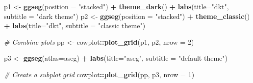 \documentclass[fleqn,10pt]{wlpeerj} %
\newenvironment{Shaded}{\begin{snugshade}}{\end{snugshade}}
\newcommand{\CommentTok}[1]{\textcolor[rgb]{0.56,0.35,0.01}{\textit{#1}}}
\newcommand{\DataTypeTok}[1]{\textcolor[rgb]{0.13,0.29,0.53}{#1}}
\newcommand{\DecValTok}[1]{\textcolor[rgb]{0.00,0.00,0.81}{#1}}
\newcommand{\KeywordTok}[1]{\textcolor[rgb]{0.13,0.29,0.53}{\textbf{#1}}}
\newcommand{\NormalTok}[1]{#1}
\newcommand{\OperatorTok}[1]{\textcolor[rgb]{0.81,0.36,0.00}{\textbf{#1}}}
\newcommand{\StringTok}[1]{\textcolor[rgb]{0.31,0.60,0.02}{#1}}
\begin{document}
\begin{Shaded}
\begin{Highlighting}[]
\NormalTok{p1 <-}\StringTok{ }\KeywordTok{ggseg}\NormalTok{(}\DataTypeTok{position =} \StringTok{"stacked"}\NormalTok{) }\OperatorTok{+}\StringTok{ }
\StringTok{  }\KeywordTok{theme_dark}\NormalTok{() }\OperatorTok{+}\StringTok{ }
\StringTok{  }\KeywordTok{labs}\NormalTok{(}\DataTypeTok{title=}\StringTok{"dkt"}\NormalTok{, }\DataTypeTok{subtitle =} \StringTok{"dark theme"}\NormalTok{)}
\NormalTok{p2 <-}\StringTok{ }\KeywordTok{ggseg}\NormalTok{(}\DataTypeTok{position =} \StringTok{"stacked"}\NormalTok{) }\OperatorTok{+}\StringTok{ }
\StringTok{  }\KeywordTok{theme_classic}\NormalTok{() }\OperatorTok{+}\StringTok{ }
\StringTok{  }\KeywordTok{labs}\NormalTok{(}\DataTypeTok{title=}\StringTok{"dkt"}\NormalTok{, }\DataTypeTok{subtitle =} \StringTok{"classic theme"}\NormalTok{)}

\CommentTok{# Combine plots}
\NormalTok{pp <-}\StringTok{ }\NormalTok{cowplot}\OperatorTok{::}\KeywordTok{plot_grid}\NormalTok{(p1, p2, }\DataTypeTok{nrow =} \DecValTok{2}\NormalTok{)}

\NormalTok{p3 <-}\StringTok{ }\KeywordTok{ggseg}\NormalTok{(}\DataTypeTok{atlas=}\NormalTok{aseg) }\OperatorTok{+}\StringTok{ }
\StringTok{  }\KeywordTok{labs}\NormalTok{(}\DataTypeTok{title=}\StringTok{"aseg"}\NormalTok{, }\DataTypeTok{subtitle =} \StringTok{"default theme"}\NormalTok{)}

\CommentTok{# Create a subplot grid}
\NormalTok{cowplot}\OperatorTok{::}\KeywordTok{plot_grid}\NormalTok{(pp, p3, }\DataTypeTok{nrow =} \DecValTok{1}\NormalTok{)}
\end{Highlighting}
\end{Shaded}
\end{document}
